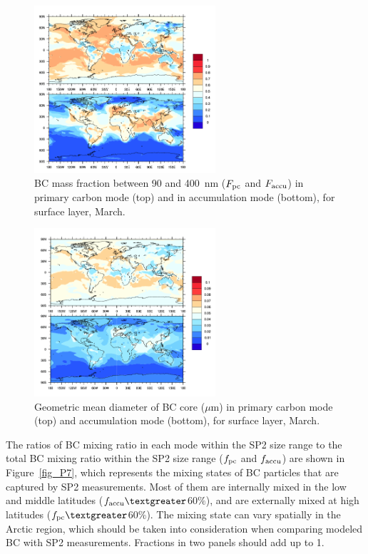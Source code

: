 \documentclass[11pt]{article}
\begin{document}
	\begin{figure}[!h] 
		\begin{center}
			\includegraphics[width = 0.6\textwidth]{Rplot02}
			\caption[]{\label{fig_P5} BC mass fraction between 90 and 400~nm ($F_{\rm pc}$ and $F_{\rm accu}$) in primary carbon mode (top) and in accumulation mode (bottom), for surface layer, March.}
		\end{center}
	\end{figure}
	
	\begin{figure}[!h] 
		\begin{center}
			\includegraphics[width = 0.6\textwidth]{Rplot03}
			\caption[]{\label{fig_P6} Geometric mean diameter of BC core ($\mu$m) in primary carbon mode (top) and accumulation mode (bottom), for surface layer, March.}
		\end{center}
	\end{figure}
	
	
	
	The ratios of BC mixing ratio in each mode within the SP2 size range to the total BC mixing ratio within the SP2 size range ($f_{\rm pc}$ and $f_{\rm accu}$) are shown in Figure~\ref{fig_P7}, which represents the mixing states of BC particles that are captured by SP2 measurements. Most of them are internally mixed in the low and middle
	latitudes ($f_{\rm accu}\textgreater$60$\%$), and are externally mixed at high latitudes ($f_{\rm pc}\textgreater$60$\%$). The mixing state can vary spatially in the Arctic region,
	which should be taken into consideration when comparing modeled BC
	with SP2 measurements. Fractions in two panels should add up to 1.
	
\end{document}
